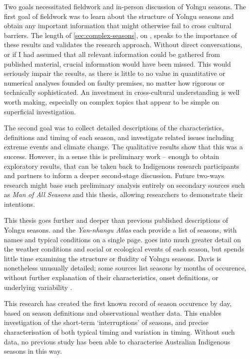 Two goals necessitated fieldwork and in-person discussion of Yolngu seasons.
The first goal of fieldwork  was to learn about the structure of Yolngu
seasons and obtain any important information that might otherwise
fail to cross cultural barriers.  The length of \cref{sec:complex-seasons},
on \textit{}, speaks to the importance of these
results and validates the research approach.
%
Without direct conversations, or if I had assumed that all relevant information
could be gathered from published material, crucial information would have been
missed.  This would seriously impair the results, as there is little to no value
in quantitative or numerical analyses
founded on faulty premises, no matter how rigorous or technically sophisticated.
An investment in cross-cultural understanding is well worth making, especially
on complex topics that appear to be simple on superficial investigation.

The second goal was to collect detailed descriptions of the characteristics,
definitions and timing of each season, and investigate related issues
including extreme events and climate change.  The qualitative results
show that this was a success.  However, in a sense this is preliminary work --
enough to obtain exploratory results, that can be taken back to Indigenous
research participants and partners to inform a deeper second-stage discussion.  Future
two-ways research might base such preliminary analysis entirely on secondary sources
such as \textit{Man of All Seasons} \citep{davis1989} and this thesis,
allowing researchers to demonstrate their intentions.


This thesis goes further and deeper than previous published descriptions of Yolngu seasons.
\citet{barber2005} and the \textit{Yan-nhangu Atlas} \citep{atlas2014} each
provide a list of seasons, with names and typical conditions on a single page.
\citet{davis1989} goes into much greater detail on the weather conditions and
social or ecological events of each season, but spends little time examining
the structure or fluidity of Yolngu seasons.  Davis is nonetheless unusually
detailed; some sources \citep[eg.][]{BOM-iwk} list seasons by months of
occurence, without further explanation of their characteristics,
onset definitions, or underlying variability .


This research has created the first known record of season occurence by day,
based on season definitions and observational weather data.  This enables
investigation of the short-term `interruptions' of seasons, and precise
characterisation of both typical timing and variation in timing.  Without
such data, no previous study \citep[eg.][]{davis1989,barber2005,CSIROcals,BOM-iwk}
has been able to characterise Australian Indigenous seasons in this way.



